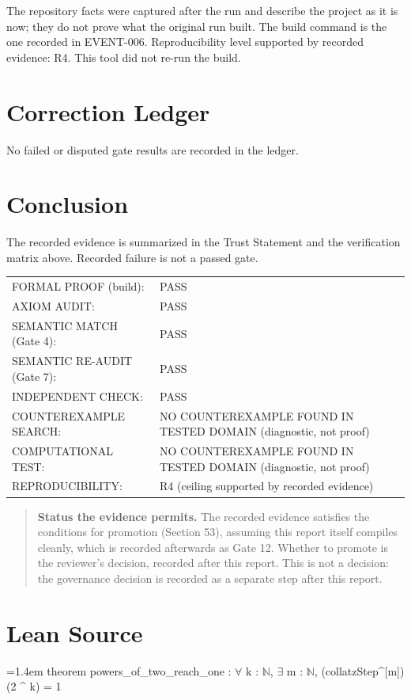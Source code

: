 \documentclass[11pt]{article}
\begin{document}
The repository facts were captured after the run and describe the project as it is now; they do not prove what the original run built. The build command is the one recorded in EVENT-006.
Reproducibility level supported by recorded evidence: R4. This tool did not re-run the build.
\section{Correction Ledger}
No failed or disputed gate results are recorded in the ledger.


\section{Conclusion}
The recorded evidence is summarized in the Trust Statement and the verification matrix above. Recorded failure is not a passed gate.
\begin{center}\begin{tabular}{@{}p{}p{}@{}}
FORMAL PROOF (build): & PASS \\
AXIOM AUDIT: & PASS \\
SEMANTIC MATCH (Gate 4): & PASS \\
SEMANTIC RE-AUDIT (Gate 7): & PASS \\
INDEPENDENT CHECK: & PASS \\
COUNTEREXAMPLE SEARCH: & NO COUNTEREXAMPLE FOUND IN TESTED DOMAIN (diagnostic, not proof) \\
COMPUTATIONAL TEST: & NO COUNTEREXAMPLE FOUND IN TESTED DOMAIN (diagnostic, not proof) \\
REPRODUCIBILITY: & R4 (ceiling supported by recorded evidence) \\
\end{tabular}\end{center}
\begin{quote}\textbf{Status the evidence permits.} The recorded evidence satisfies the conditions for promotion (Section 53), assuming this report itself compiles cleanly, which is recorded afterwards as Gate 12. Whether to promote is the reviewer's decision, recorded after this report. This is not a decision: the governance decision is recorded as a separate step after this report.\end{quote}
\appendix
\section{Lean Source}
{\footnotesize\ttfamily\raggedright\hangindent=1.4em\noindent
\hspace*{0.00em}theorem powers\_\allowbreak{}of\_\allowbreak{}two\_\allowbreak{}reach\_\allowbreak{}one : \ensuremath{\forall} k : \ensuremath{\mathbb{N}}, \ensuremath{\exists} m : \ensuremath{\mathbb{N}}, (collatzStep\textasciicircum{}[m]) (2 \textasciicircum{} k) = 1\par
}
\end{document}
